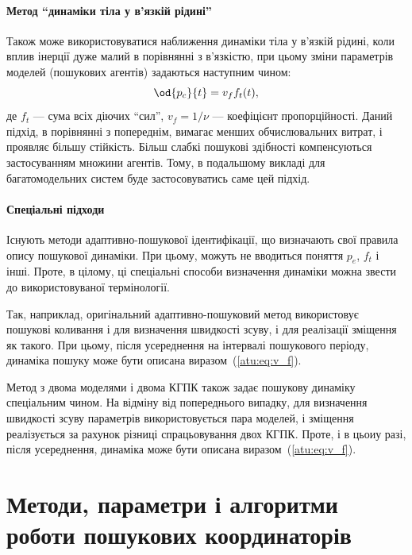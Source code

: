 \paragraph{Метод ``динаміки тіла у в'язкій рідині''}

Також може використовуватися наближення динаміки тіла у в'язкій рідині, коли
вплив інерції дуже малий в порівнянні з в'язкістю, при цьому зміни параметрів
моделей (пошукових агентів) задаються наступним чином:
%
\begin{equation}
  \od{p_c}{t} = v_f f_t(t),
  \label{atu:eq:v_f}
\end{equation}
%
\noindent
де $f_t$ --- сума всіх діючих ``сил'',
$v_f = 1 / \nu$ --- коефіцієнт
пропорційності. Даний підхід, в порівнянні з попереднім, вимагає менших
обчислювальних витрат, і проявляє більшу стійкість. Більш слабкі пошукові
здібності компенсуються застосуванням множини агентів. Тому, в подальшому
викладі для багатомодельних систем буде застосовуватись саме цей підхід.

\paragraph{Спеціальні підходи}

Існують методи адаптивно-пошукової ідентифікації, що визначають
свої правила опису пошукової динаміки. При цьому, можуть не
вводиться поняття
$p_e$,
$f_t$ і інші. Проте, в цілому, ці спеціальні способи визначення
динаміки можна звести до використовуваної термінології.

Так, наприклад, оригінальний адаптивно-пошуковий метод
використовує пошукові коливання і для визначення швидкості
зсуву, і для реалізації зміщення як такого. При цьому, після
усереднення на інтервалі пошукового періоду, динаміка пошуку
може бути описана виразом~(\ref{atu:eq:v_f}).

Метод з двома моделями і двома КГПК також задає пошукову
динаміку спеціальним чином. На відміну від попереднього випадку,
для визначення швидкості зсуву параметрів використовується
пара моделей, і зміщення реалізується за рахунок різниці
спрацьовування двох КГПК. Проте, і в цьоиу разі, після усереднення,
динаміка може бути описана виразом~(\ref{atu:eq:v_f}).








\section{Методи, параметри і алгоритми роботи пошукових координаторів} %

